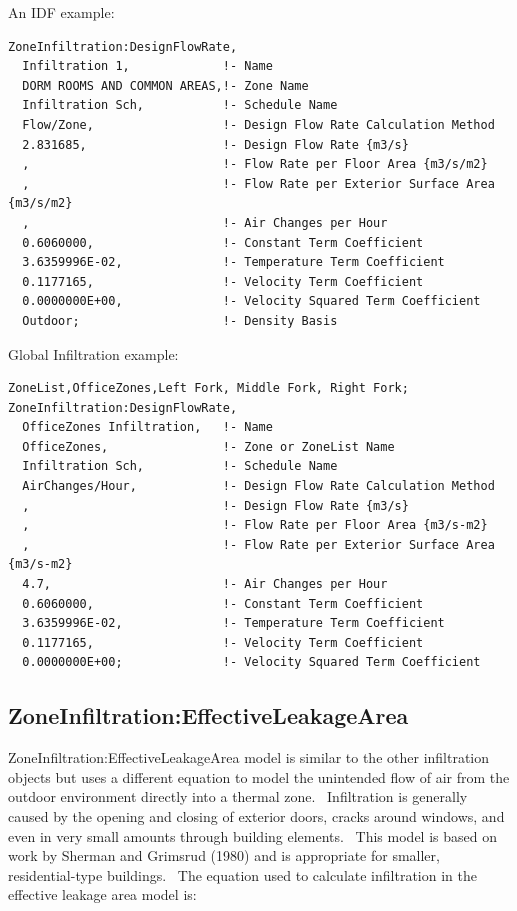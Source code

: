 An IDF example:

\begin{lstlisting}
ZoneInfiltration:DesignFlowRate,
  Infiltration 1,             !- Name
  DORM ROOMS AND COMMON AREAS,!- Zone Name
  Infiltration Sch,           !- Schedule Name
  Flow/Zone,                  !- Design Flow Rate Calculation Method
  2.831685,                   !- Design Flow Rate {m3/s}
  ,                           !- Flow Rate per Floor Area {m3/s/m2}
  ,                           !- Flow Rate per Exterior Surface Area {m3/s/m2}
  ,                           !- Air Changes per Hour
  0.6060000,                  !- Constant Term Coefficient
  3.6359996E-02,              !- Temperature Term Coefficient
  0.1177165,                  !- Velocity Term Coefficient
  0.0000000E+00,              !- Velocity Squared Term Coefficient
  Outdoor;                    !- Density Basis
\end{lstlisting}

Global Infiltration example:

\begin{lstlisting}
ZoneList,OfficeZones,Left Fork, Middle Fork, Right Fork;
ZoneInfiltration:DesignFlowRate,
  OfficeZones Infiltration,   !- Name
  OfficeZones,                !- Zone or ZoneList Name
  Infiltration Sch,           !- Schedule Name
  AirChanges/Hour,            !- Design Flow Rate Calculation Method
  ,                           !- Design Flow Rate {m3/s}
  ,                           !- Flow Rate per Floor Area {m3/s-m2}
  ,                           !- Flow Rate per Exterior Surface Area {m3/s-m2}
  4.7,                        !- Air Changes per Hour
  0.6060000,                  !- Constant Term Coefficient
  3.6359996E-02,              !- Temperature Term Coefficient
  0.1177165,                  !- Velocity Term Coefficient
  0.0000000E+00;              !- Velocity Squared Term Coefficient
\end{lstlisting}

\subsection{ZoneInfiltration:EffectiveLeakageArea}\label{zoneinfiltrationeffectiveleakagearea}

ZoneInfiltration:EffectiveLeakageArea model is similar to the other infiltration objects but uses a different equation to model the unintended flow of air from the outdoor environment directly into a thermal zone.~ Infiltration is generally caused by the opening and closing of exterior doors, cracks around windows, and even in very small amounts through building elements.~ This model is based on work by Sherman and Grimsrud (1980) and is appropriate for smaller, residential-type buildings.~ The equation used to calculate infiltration in the effective leakage area model is:

